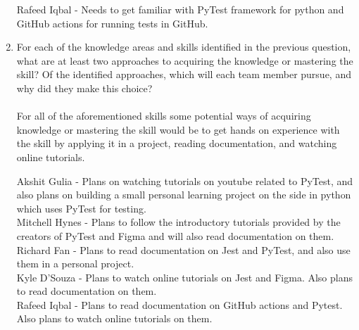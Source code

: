 \documentclass[12pt, titlepage]{article}
\begin{document}
\begin{enumerate}
    Rafeed Iqbal - Needs to get familiar with PyTest framework for
    python and GitHub actions for running tests in GitHub. \\

  \item For each of the knowledge areas and skills identified in the previous
    question, what are at least two approaches to acquiring the knowledge or
    mastering the skill?  Of the identified approaches, which will each team
    member pursue, and why did they make this choice?\\
    \\

    For all of the aforementioned skills some potential ways of
    acquiring knowledge or mastering the skill would be to get hands
    on experience with the skill by applying it in a project, reading
    documentation, and watching online tutorials.

    Akshit Gulia - Plans on watching tutorials on youtube related to
    PyTest, and also plans on building a small personal learning
    project on the side in python which uses PyTest for testing. \\

    Mitchell Hynes - Plans to follow the introductory tutorials
    provided by the creators of PyTest and Figma and will also read
    documentation on them. \\

    Richard Fan - Plans to read documentation on Jest and PyTest, and
    also use them in a personal project. \\

    Kyle D'Souza - Plans to watch online tutorials on Jest and Figma.
    Also plans to read documentation on them. \\

    Rafeed Iqbal - Plans to read documentation on GitHub actions and
    Pytest. Also plans to watch online tutorials on them. \\
\end{enumerate}
\end{document}
